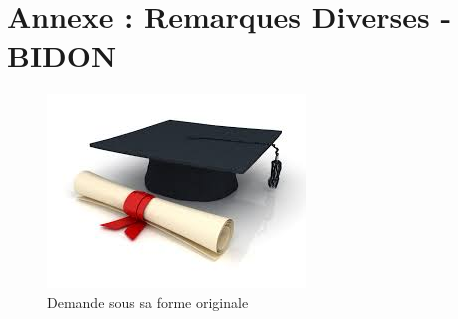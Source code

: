 \setcounter{figure}{0}
\setcounter{table}{0}
\setcounter{footnote}{0}
\setcounter{equation}{0}
\pagestyle{fancy}
\fancyhf{}
\renewcommand{\chaptermark}[1]{\markboth{\MakeUppercase{#1 }}{}}
\renewcommand{\sectionmark}[1]{\markright{\thesection~ #1}}
\fancyhead[RO]{\bfseries\rightmark}
\fancyhead[LE]{\bfseries\leftmark}
\fancyfoot[RO]{\thepage}
\fancyfoot[LE]{\thepage}
\renewcommand{\headrulewidth}{0.5pt}
\renewcommand{\footrulewidth}{0pt}

\makeatletter
\renewcommand\thefigure{A.\arabic{figure}}
\renewcommand\thetable{A.\arabic{table}}
\makeatother

\chapter{Annexe : Remarques Diverses - BIDON}
\graphicspath{{Annexe1/figures/}}



\begin{figure}[!ht]
\centering
\includegraphics[scale=1]{ingenieur.jpg}
\caption{Demande sous sa forme originale}
\label{demOrgForm}
\end{figure} 
